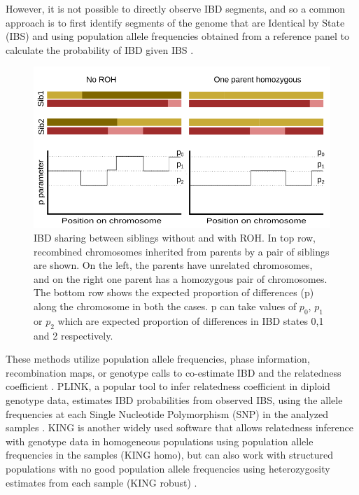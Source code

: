\documentclass[12pt, letterpaper]{article}
\begin{document}
However, it is not possible to directly observe IBD segments, and so a common approach is to first identify segments of the genome that are Identical by State (IBS) and using population allele frequencies obtained from a reference panel to calculate the probability of IBD given IBS \cite{vai_KINship_2020, boehnke_accurate_1997,lynch_estimation_1999, albrechtsen_natural_2010, purcell_plink_2007}.
\begin{figure}[h!]
    \includegraphics[width=18cm]{plots/inkscape_finalImg/schematic_sib.png}
    \centering
    \caption{IBD sharing between siblings without and with ROH. In top row, recombined chromosomes inherited from parents by a pair of siblings are shown. On the left, the parents have unrelated chromosomes, and on the right one parent has a homozygous pair of chromosomes. The bottom row shows the expected proportion of differences (p) along the chromosome in both the cases. p can take values of $p_0$, $p_1$ or $p_2$ which are expected proportion of differences in IBD states 0,1 and 2 respectively.  }
    \label{fig0:schematic}
\end{figure}


These methods utilize population allele frequencies, phase information, recombination maps, or genotype calls to co-estimate IBD and the relatedness coefficient \cite{huff_maximum-likelihood_2011,li_relationship_2014,li_accurate_2014,thornton_estimating_2012}.  PLINK, a popular tool to infer relatedness coefficient in diploid genotype data, estimates IBD probabilities from observed IBS, using the allele frequencies at each Single Nucleotide Polymorphism (SNP) in the analyzed samples \cite{purcell_plink_2007}. KING is another widely used software that allows relatedness inference with genotype data in homogeneous populations using population allele frequencies in the samples (KING homo), but can also work with structured populations with no good population allele frequencies using heterozygosity estimates from each sample (KING robust) \cite{manichaikul_robust_2010}. 
\end{document}
